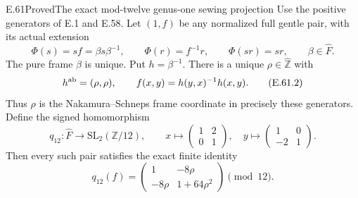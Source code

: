 \begin{statement}{E.61}{Proved}{The exact mod-twelve genus-one sewing projection}
Use the positive generators of E.1 and E.58.  Let $(1,f)$ be any
normalized full gentle pair, with its actual extension
\[
 \Phi(s)=sf=\beta s\beta^{-1},\qquad
 \Phi(r)=f^{-1}r,\qquad \Phi(sr)=sr,
 \qquad \beta\in\widehat F.
 \tag{E.61.1}
\]
The pure frame $\beta$ is unique.  Put $h=\beta^{-1}$.  There is a
unique $\rho\in\widehat{\mathbb Z}$ with
\[
 h^{\rm ab}=(\rho,\rho),\qquad
 f(x,y)=h(y,x)^{-1}h(x,y).
 \tag{E.61.2}
\]
Thus $\rho$ is the Nakamura--Schneps frame coordinate in precisely
these generators.  Define the signed homomorphism
\[
 q_{12}:\widehat F\longrightarrow\mathrm{SL}_2(\mathbb Z/12),
 \qquad
 x\longmapsto\begin{pmatrix}1&2\\0&1\end{pmatrix},\quad
 y\longmapsto\begin{pmatrix}1&0\\-2&1\end{pmatrix}.
 \tag{E.61.3}
\]
Then every such pair satisfies the exact finite identity
\[
 q_{12}(f)=
 \begin{pmatrix}1&-8\rho\\-8\rho&1+64\rho^2\end{pmatrix}
                      \pmod {12}.
 \tag{E.61.4}
\]


\end{statement}

